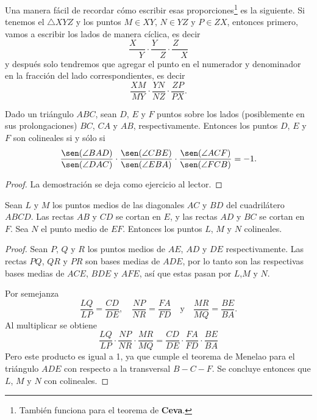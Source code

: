 \begin{remark.tcb}
    Una manera fácil de recordar cómo escribir esas proporciones\footnote{También funciona para el teorema de \textbf{Ceva}.} es la siguiente.
    Si tenemos el $\triangle XYZ$ y los puntos $M \in XY$, $N \in YZ$ y $P \in ZX$, entonces primero, vamos a escribir los lados de manera cíclica, es decir
    \[
        \frac{X\quad}{\quad Y} \cdot \frac{Y\quad}{\quad Z} \cdot \frac{Z\quad}{\quad X}
    \]
    y después solo tendremos que agregar el punto en el numerador y denominador en la fracción del lado correspondientes, es decir
    \[
        \frac{XM}{MY} \cdot \frac{YN}{NZ} \cdot \frac{ZP}{PX}.
    \]
\end{remark.tcb}

\begin{section-theorem.tcb}
    Dado un triángulo $ABC$, sean $D$, $E$ y $F$ puntos sobre los lados (posiblemente en sus prolongaciones) $BC$, $CA$ y $AB$, respectivamente.
    Entonces los puntos $D$, $E$ y $F$ son colineales si y sólo si
    \[
        \frac{\sen(\angle BAD)}{\sen(\angle DAC)} \cdot \frac{\sen(\angle CBE)}{\sen(\angle EBA)} \cdot \frac{\sen(\angle ACF)}{\sen(\angle FCB)} = -1.
    \]
\end{section-theorem.tcb}
\begin{proof}
    La demostración se deja como ejercicio al lector.
\end{proof}


\begin{section-theorem.tcb}
    Sean $L$ y $M$ los puntos medios de las diagonales $AC$ y $BD$ del cuadrilátero $ABCD$.
    Las rectas $AB$ y $CD$ se cortan en $E$, y las rectas $AD$ y $BC$ se cortan en $F$.
    Sea $N$ el punto medio de $EF$.
    Entonces los puntos $L$, $M$ y $N$ colineales.
\end{section-theorem.tcb}
\begin{proof}
    Sean $P$, $Q$ y $R$ los puntos medios de $AE$, $AD$ y $DE$ respectivamente.
    Las rectas $PQ$, $QR$ y $PR$ son bases medias de $ADE$, por lo tanto son las respectivas bases medias de $ACE$, $BDE$ y $AFE$, así que estas pasan por $L$,$M$ y $N$.
    \begin{figure}[H]
        \centering
        
    \end{figure}
    Por semejanza
    \[
        \frac{LQ}{LP} = \frac{CD}{DE},\quad \frac{NP}{NR} = \frac{FA}{FD}\quad \text{y} \quad \frac{MR}{MQ} = \frac{BE}{BA}.
    \]
    Al multiplicar se obtiene
    \[
        \frac{LQ}{LP} \cdot \frac{NP}{NR} \cdot \frac{MR}{MQ} = \frac{CD}{DE} \cdot \frac{FA}{FD} \cdot \frac{BE}{BA}
    \]
    Pero este producto es igual a 1, ya que cumple el teorema de Menelao para el triángulo $ADE$ con respecto a la transversal $B-C-F$.
    Se concluye entonces que $L$, $M$ y $N$ con colineales.
\end{proof}



